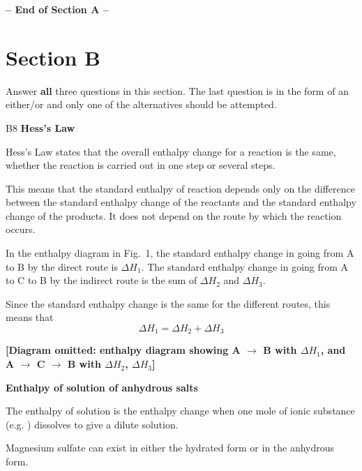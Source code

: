 \documentclass[11pt]{exam}
\begin{document}
\vfill
\begin{center}
\textbf{-- End of Section A --}
\end{center}

\newpage


\section*{Section B}

Answer \textbf{all} three questions in this section. The last question is in the form of an either/or and only one of the alternatives should be attempted.

\begin{questions}

\setcounter{question}{0}
\question B8 \textbf{Hess's Law}

Hess's Law states that the overall enthalpy change for a reaction is the same, whether the reaction is carried out in one step or several steps.

This means that the standard enthalpy of reaction depends only on the difference between the standard enthalpy change of the reactants and the standard enthalpy change of the products. It does not depend on the route by which the reaction occurs.

In the enthalpy diagram in Fig.~1, the standard enthalpy change in going from A to B by the direct route is $\Delta H_1$. The standard enthalpy change in going from A to C to B by the indirect route is the sum of $\Delta H_2$ and $\Delta H_3$.

Since the standard enthalpy change is the same for the different routes, this means that
\[\Delta H_1 = \Delta H_2 + \Delta H_3\]

\textbf{[Diagram omitted: enthalpy diagram showing A $\rightarrow$ B with $\Delta H_1$, and A $\rightarrow$ C $\rightarrow$ B with $\Delta H_2$, $\Delta H_3$]}

\textbf{Enthalpy of solution of anhydrous salts}

The enthalpy of solution is the enthalpy change when one mole of ionic substance (e.g. ) dissolves to give a dilute solution.


Magnesium sulfate can exist in either the hydrated form or in the anhydrous form.


\end{questions}
\end{document}
